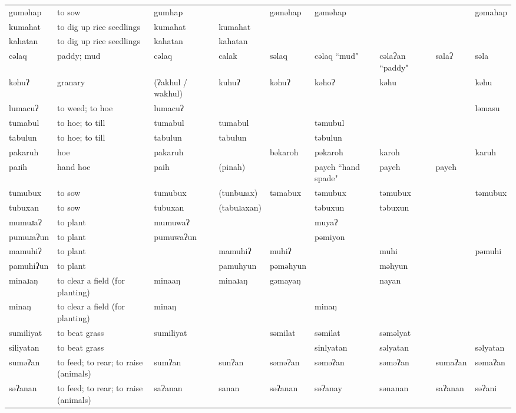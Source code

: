 \begin{landscape}
\begin{longtable}{*{9}{p{}}}
\text{*}guməhap & to sow & gumhap &  & gəməhap & gəməhap &  &  & gəmahap\\
\text{*}kumahat & to dig up rice seedlings & kumahat & kumahat &  &  &  &  & \\
\text{*}kahatan & to dig up rice seedlings & kahatan & kahatan &  &  &  &  & \\
\text{*}cəlaq & paddy; mud & cəlaq & calak & səlaq & cəlaq ``mud" & cəlaʔan ``paddy" & salaʔ & səla\\
\text{*}kəhuʔ & granary & (ʔakhul / wakhul) & kuhuʔ & kəhuʔ & kəhoʔ & kəhu &  & kəhu\\
\text{*}lumacuʔ & to weed; to hoe & lumacuʔ &  &  &  &  &  & ləmasu\\
\text{*}tumabul & to hoe; to till & tumabul & tumabul &  & təmubul &  &  & \\
\text{*}tabulun & to hoe; to till & tabulun & tabulun &  & təbulun &  &  & \\
\text{*}pakaruh & hoe & pakaruh &  & bəkaroh & pəkaroh & karoh &  & karuh\\
\text{*}paɹih & hand hoe & paih & (pinah) &  & payeh ``hand spade" & payeh & payeh & \\
\text{*}tumubux & to sow & tumubux & (tunbuɹax) & təmabux & təmubux & təmubux &  & təmubux\\
\text{*}tubuxan & to sow & tubuxan & (tabuɹaxan) &  & təbuxun & təbuxun &  & \\
\text{*}mumuɹaʔ & to plant & mumuwaʔ &  &  & muyaʔ &  &  & \\
\text{*}pumuɹaʔun & to plant & pumuwaʔun &  &  & pəmiyon &  &  & \\
\text{*}mamuhiʔ & to plant &  & mamuhiʔ & muhiʔ &  & muhi &  & pəmuhi\\
\text{*}pamuhiʔun & to plant &  & pamuhyun & pəməhyun &  & məhyun &  & \\
\text{*}minaɹaŋ & to clear a field (for planting) & minaaŋ & minaɹaŋ & gəmayaŋ &  & nayan &  & \\
\text{*}minaŋ & to clear a field (for planting) & minaŋ &  &  & minaŋ &  &  & \\
\text{*}sumiliyat & to beat grass & sumiliyat &  & səmilat & səmilat & səməlyat &  & \\
\text{*}siliyatan & to beat grass &  &  &  & sinlyatan & səlyatan &  & səlyatan\\
\text{*}suməʔan & to feed; to rear; to raise (animals) & sumʔan & sunʔan & səməʔan & səməʔan & səməʔan & sumaʔan & səmaʔan\\
\text{*}səʔanan & to feed; to rear; to raise (animals) & saʔanan & sanan & səʔanan & səʔanay & sənanan & saʔanan & səʔani\\

\end{longtable}
\end{landscape}

